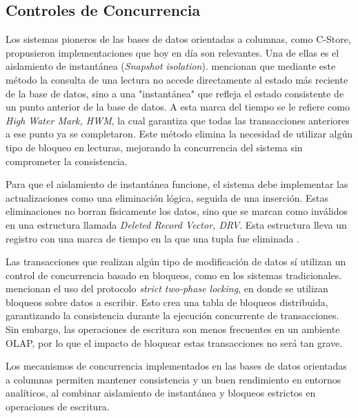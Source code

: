 \subsection{Controles de Concurrencia}
Los sistemas pioneros de las bases de datos orientadas a columnas, como C-Store, propusieron implementaciones que hoy en día son relevantes. Una de ellas es el aislamiento de instantánea (\textit{Snapshot isolation}). \textcite{stonebraker2005cstore} mencionan que mediante este método la consulta de una lectura no accede directamente al estado más reciente de la base de datos, sino a una "instantánea" que refleja el estado consistente de un punto anterior de la base de datos. A esta marca del tiempo se le refiere como \textit{High Water Mark, HWM}, la cual garantiza que todas las transacciones anteriores a ese punto ya se completaron. Este método elimina la necesidad de utilizar algún tipo de bloqueo en lecturas, mejorando la concurrencia del sistema sin comprometer la consistencia.

Para que el aislamiento de instantánea funcione, el sistema debe implementar las actualizaciones como una eliminación lógica, seguida de una inserción. Estas eliminaciones no borran físicamente los datos, sino que se marcan como inválidos en una estructura llamada \textit{Deleted Record Vector, DRV}. Esta estructura lleva un registro con una marca de tiempo en la que una tupla fue eliminada \parencite{stonebraker2005cstore}.

Las transacciones que realizan algún tipo de modificación de datos sí utilizan un control de concurrencia basado en bloqueos, como en los sistemas tradicionales. \textcite{stonebraker2005cstore} mencionan el uso del protocolo \textit{strict two-phase locking}, en donde se utilizan bloqueos sobre datos a escribir. Esto crea una tabla de bloqueos distribuida, garantizando la consistencia durante la ejecución concurrente de transacciones. Sin embargo, las operaciones de escritura son menos frecuentes en un ambiente OLAP, por lo que el impacto de bloquear estas transacciones no será tan grave.

Los mecanismos de concurrencia implementados en las bases de datos orientadas a columnas permiten mantener consistencia y un buen rendimiento en entornos analíticos, al combinar aislamiento de instantánea y bloqueos estrictos en operaciones de escritura.